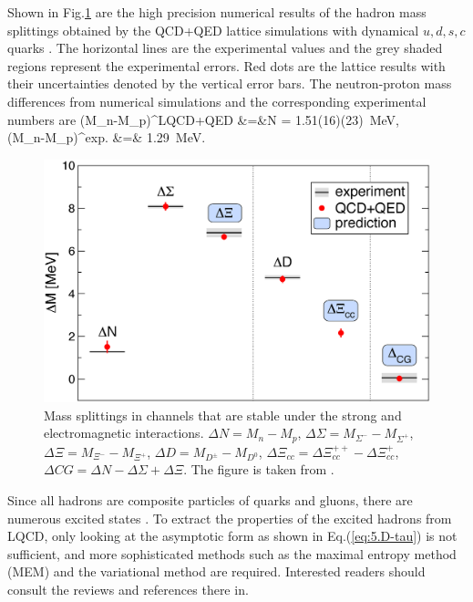 Shown in Fig.\ref{fig:pn-mass} are the high precision numerical results of the 
 hadron mass splittings obtained by the 
 QCD+QED  lattice simulations with dynamical  $u,d,s,c$ quarks \cite{Borsanyi:2014jba}.
 The horizontal lines are the
experimental values and the grey shaded regions represent the experimental errors.
Red dots are the lattice results with their uncertainties denoted by the vertical error bars.
The neutron-proton mass differences from numerical simulations 
and the corresponding experimental numbers are
\beq
(M_n-M_p)^{\rm LQCD+QED} &=&\Delta N = 1.51(16)(23)\   {\rm MeV}, \\
(M_n-M_p)^{\rm exp.} &=& 1.29\   {\rm MeV}. 
\eeq

\begin{figure}[t]
\begin{center}
\includegraphics[scale=0.2]{Chapter3-figures/pn-mass.eps}
 \end{center}
\caption{Mass splittings in channels that are stable under the strong and electromagnetic interactions.
$\Delta N=M_n-M_p$, $\Delta \Sigma = M_{\Sigma^-}- M_{\Sigma^+}$,
$\Delta \Xi =M_{\Xi^-}- M_{\Xi^+}$,
$\Delta D= M_{D^{\pm}} - M_{D^0}$,
$\Delta \Xi_{cc} = \Delta \Xi_{cc}^{++} - \Delta \Xi_{cc}^{+}$,
$\Delta CG = \Delta N-\Delta \Sigma + \Delta \Xi$.
The figure is taken from
\cite{Borsanyi:2014jba}.
  }
\label{fig:pn-mass}
\end{figure}

Since all hadrons are composite particles of quarks and gluons,
there are numerous excited states  \cite{RPP}.  To extract the properties of the
excited hadrons from LQCD,  only looking at the asymptotic form as shown in Eq.(\ref{eq:5.D-tau}) is not
 sufficient, and more sophisticated methods such as  
 the maximal entropy method (MEM)  and  the variational method  are required.
 Interested readers should consult the reviews \cite{Asakawa:2000tr,Fodor:2012gf} and references there in.


